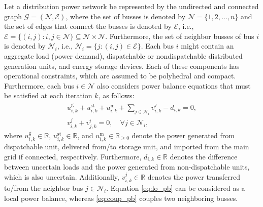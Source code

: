 

Let a distribution power network be represented by the undirected and connected graph $\mathcal{G}=(\mathcal{N},\mathcal{E})$, where the set of busses is denoted by $\mathcal{N}=\{1,2,\dots,n\}$ and the set of edges that connect the busses is denoted by $\mathcal{E}$, i.e., $\mathcal{E}=\{(i,j):i,j\in\mathcal{N} \}\subseteq\mathcal{N}\times\mathcal{N}$. Furthermore, the set of neighbor busses of bus $i$ is denoted by $\mathcal{N}_i$, i.e., $\mathcal{N}_i = \{j:(i,j)\in \mathcal{E} \}$. Each bus $i$ might contain an aggregate load (power demand), dispatchable or nondispatchable distributed generation units, and energy storage devices. Each of these components has operational constraints, which are assumed to be polyhedral and compact. Furthermore, each bus $i \in \mathcal{N}$ also considers power balance equations that must be satisfied  at each iteration $k$, as follows: 
\begin{align}
u^{\mathrm{g}}_{i,k} + u^{\mathrm{st}}_{i,k} + u^{\mathrm{m}}_{i,k} + \sum_{j \in \mathcal{N}_i} v^{j}_{i,k} - {d}_{i,k}=0,  \label{eq:lo_pb}\\
v^{j}_{i,k} + v^{i}_{j,k} = 0, \quad \forall j \in \mathcal{N}_i, \label{eq:coup_pb}
\end{align}
where  ${u}_{i,k}^{\mathrm{g}}\in \mathbb{R}$, $u^{\mathrm{st}}_{i,k}\in \mathbb{R}$, and $u_{i,k}^{\mathrm{m}} \in \mathbb{R}_{\geq 0}$ denote the power generated from dispatchable unit, delivered from/to storage unit, and imported from the main grid if connected, respectively.  %
Furthermore, $d_{i,k}\in \mathbb{R}$ denotes the difference between uncertain loads and the power generated from non-dispatchable units, which is also uncertain. Additionally, $v_{i,k}^{j} \in \mathbb{R}$ denotes the power transferred to/from the neighbor bus $j  \in \mathcal{N}_i$. Equation \eqref{eq:lo_pb} can be considered as a local power balance, whereas \eqref{eq:coup_pb} couples two neighboring busses.

